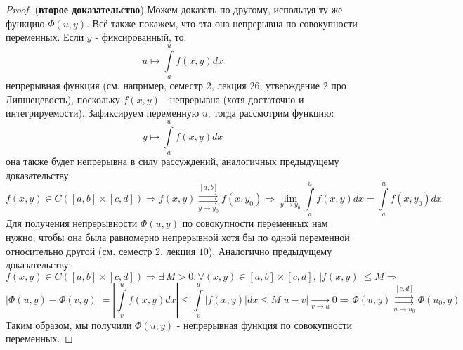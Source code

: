 \documentclass[12pt]{article}
\theoremstyle{definition}
\newcommand{\ddint}[2]{\displaystyle\int\limits_{#1}^{#2}}
\newcommand{\uconvm}[2]{\overset{#1}{\underset{#2}{\rightrightarrows}}}
\begin{document}
\begin{proof}(\textbf{второе доказательство})
	Можем доказать по-другому, используя ту же функцию $\Phi(u,y)$. Всё также покажем, что эта она непрерывна по совокупности переменных. Если $y$ - фиксированный, то:
	$$
		u \mapsto \ddint{a}{u}f(x,y)dx
	$$ 
	непрерывная функция (см. например, семестр $2$, лекция $26$, утверждение $2$ про Липшецевость), поскольку $f(x,y)$ - непрерывна (хотя достаточно и интегрируемости). Зафиксируем переменную $u$, тогда рассмотрим функцию:
	$$	
		y \mapsto \ddint{a}{u}f(x,y)dx
	$$
	она также будет непрерывна в силу рассуждений, аналогичных предыдущему доказательству:
	$$
		f(x,y) \in C([a,b]\times[c,d]) \Rightarrow f(x,y) \uconvm{[a,b]}{y \to y_0} f(x,y_0) \Rightarrow \lim\limits_{y \to y_0}\ddint{a}{u}f(x,y)dx = \ddint{a}{u}f(x,y_0)dx
	$$
	Для получения непрерывности $\Phi(u,y)$ по совокупности переменных нам нужно, чтобы она была равномерно непрерывной хотя бы по одной переменной относительно другой (см. семестр $2$, лекция $10$). Аналогично предыдущему доказательству:
	$$
		f(x,y) \in C([a,b]\times[c,d]) \Rightarrow \exists\, M > 0 \colon \forall (x,y) \in [a,b]\times [c,d], \, |f(x,y)| \leq M \Rightarrow
	$$
	$$
		\left|\Phi(u,y) - \Phi(v,y)\right| = \left| \ddint{v}{u}f(x,y)dx \right| \leq \ddint{v}{u}|f(x,y)|dx \leq M|u - v| \xrightarrow[v \to u]{}0 \Rightarrow \Phi(u,y) \uconvm{[c,d]}{u \to u_0} \Phi(u_0,y) 
	$$
	Таким образом, мы получили $\Phi(u,y)$ - непрерывная функция по совокупности переменных.
\end{proof}
\end{document}
